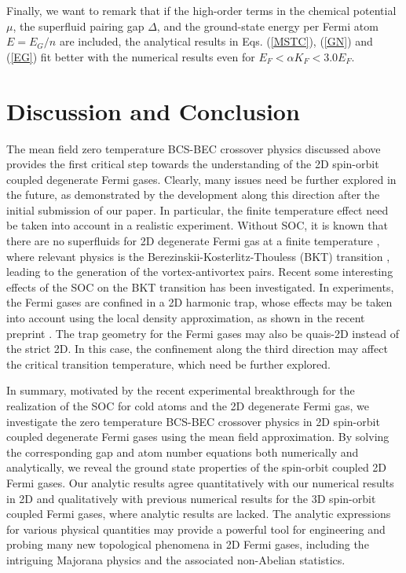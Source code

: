\documentclass[pra,print,showpacs,superscriptaddress,twocolumn]{revtex4}
\begin{document}
Finally, we want to remark that if the high-order terms in the chemical
potential $\mu $, the superfluid pairing gap $\Delta $, and the ground-state
energy per Fermi atom $E=E_{G}/n$ are included, the analytical results in
Eqs. (\ref{MSTC}), (\ref{GN}) and (\ref{EG}) fit better with the numerical
results even for $E_{F}<\alpha K_{F}<3.0E_{F}$.

\section{Discussion and Conclusion}

The mean field zero temperature BCS-BEC crossover physics discussed above
provides the first critical step towards the understanding of the 2D
spin-orbit coupled degenerate Fermi gases. Clearly, many issues need be
further explored in the future, as demonstrated by the development along
this direction after the initial submission of our paper. In particular, the
finite temperature effect need be taken into account in a realistic
experiment. Without SOC, it is known that there are no superfluids for 2D
degenerate Fermi gas at a finite temperature \cite{PCH}, where relevant
physics is the Berezinskii-Kosterlitz-Thouless (BKT) transition \cite{VLB},
leading to the generation of the vortex-antivortex pairs. Recent some
interesting effects of the SOC on the BKT transition \cite{LH} has been
investigated. In experiments, the Fermi gases are confined in a 2D harmonic
trap, whose effects may be taken into account using the local density
approximation, as shown in the recent preprint \cite{LH}. The trap geometry
for the Fermi gases may also be quais-2D instead of the strict 2D. In this
case, the confinement along the third direction may affect the critical
transition temperature, which need be further explored.

In summary, motivated by the recent experimental breakthrough for the
realization of the SOC for cold atoms and the 2D degenerate Fermi gas, we
investigate the zero temperature BCS-BEC crossover physics in 2D spin-orbit
coupled degenerate Fermi gases using the mean field approximation. By
solving the corresponding gap and atom number equations both numerically and
analytically, we reveal the ground state properties of the spin-orbit
coupled 2D Fermi gases. Our analytic results agree quantitatively with our
numerical results in 2D and qualitatively with previous numerical results
for the 3D spin-orbit coupled Fermi gases, where analytic results are
lacked. The analytic expressions for various physical quantities may provide
a powerful tool for engineering and probing many new topological phenomena
in 2D Fermi gases, including the intriguing Majorana physics and the
associated non-Abelian statistics.
\end{document}
